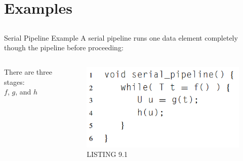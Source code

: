 \documentclass[xcolor=dvipsnames]{beamer}
\begin{document}
	
	\section{Examples} 
		\subsection{} 
			\begin{frame}{Serial Pipeline Example}
				A serial pipeline runs one data element completely though the pipeline before proceeding:
				\begin{columns}
					\begin{column}{0.35\textwidth}
						 There are three stages: \\ $f$, $g$, and $h$
					\end{column}
					\begin{column}{0.65\textwidth}
						\begin{figure}
							\includegraphics[width=2.in]{images/serialPipeline}
							\caption{LISTING 9.1}
						\end{figure} 
					\end{column}
				\end{columns}
				
			\end{frame}
		
\end{document}
